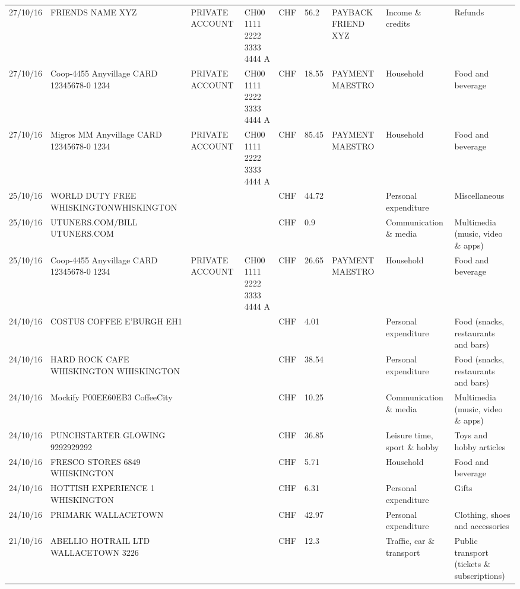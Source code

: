\begin{landscape}
\begin{center}
\begin{longtable}{lllllllll}
		27/10/16 & FRIENDS NAME XYZ & PRIVATE ACCOUNT & CH00 1111 2222 3333 4444 A & CHF   & 56.2  & PAYBACK FRIEND XYZ & Income \& credits & Refunds \\
		27/10/16 & Coop-4455 Anyvillage CARD 12345678-0 1234 & PRIVATE ACCOUNT & CH00 1111 2222 3333 4444 A & CHF   & 18.55 & PAYMENT MAESTRO & Household & Food and beverage \\
		27/10/16 & Migros MM Anyvillage CARD 12345678-0 1234 & PRIVATE ACCOUNT & CH00 1111 2222 3333 4444 A & CHF   & 85.45 & PAYMENT MAESTRO & Household & Food and beverage \\
		25/10/16 & WORLD DUTY FREE WHISKINGTONWHISKINGTON &       &       & CHF   & 44.72 &       & Personal expenditure & Miscellaneous \\
		25/10/16 & UTUNERS.COM/BILL          UTUNERS.COM &       &       & CHF   & 0.9   &       & Communication \& media & Multimedia (music, video \& apps) \\
		25/10/16 & Coop-4455 Anyvillage CARD 12345678-0 1234 & PRIVATE ACCOUNT & CH00 1111 2222 3333 4444 A & CHF   & 26.65 & PAYMENT MAESTRO & Household & Food and beverage \\
		24/10/16 & COSTUS COFFEE             E'BURGH EH1 &       &       & CHF   & 4.01  &       & Personal expenditure & Food (snacks, restaurants and bars) \\
		24/10/16 & HARD ROCK CAFE WHISKINGTON WHISKINGTON &       &       & CHF   & 38.54 &       & Personal expenditure & Food (snacks, restaurants and bars) \\
		24/10/16 & Mockify P00EE60EB3       CoffeeCity &       &       & CHF   & 10.25 &       & Communication \& media & Multimedia (music, video \& apps) \\
		24/10/16 & PUNCHSTARTER GLOWING   9292929292 &       &       & CHF   & 36.85 &       & Leisure time, sport \& hobby & Toys and hobby articles \\
		24/10/16 & FRESCO STORES 6849        WHISKINGTON &       &       & CHF   & 5.71  &       & Household & Food and beverage \\
		24/10/16 & HOTTISH EXPERIENCE 1    WHISKINGTON &       &       & CHF   & 6.31  &       & Personal expenditure & Gifts \\
		24/10/16 & PRIMARK                  WALLACETOWN &       &       & CHF   & 42.97 &       & Personal expenditure & Clothing, shoes and accessories \\
		21/10/16 & ABELLIO HOTRAIL LTD     WALLACETOWN 3226 &       &       & CHF   & 12.3  &       & Traffic, car \& transport & Public transport (tickets \& subscriptions) \\

\end{longtable}
\end{center}
\end{landscape}
